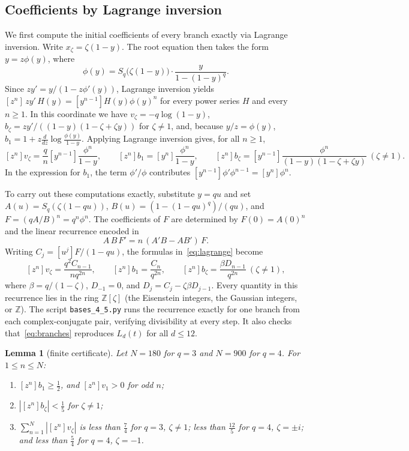 \documentclass[11pt]{amsart}
\newtheorem{lemma}[theorem]{Lemma}
\theoremstyle{remark}
\newcommand{\Z}{\mathbb{Z}}
\begin{document}
\subsection{Coefficients by Lagrange inversion}
We first compute the initial coefficients of every branch exactly via Lagrange
inversion. Write $x_\zeta=\zeta(1-y)$. The root equation then takes the form
$y=z\phi(y)$, where
\[
 \phi(y)=S_q\bigl(\zeta(1-y)\bigr)\cdot\frac{y}{1-(1-y)^q}.
\]
Since $zy'=y/(1-z\phi'(y))$, Lagrange inversion yields
$[z^n]\,zy'\,H(y)=[y^{n-1}]H(y)\phi(y)^n$ for every power series $H$ and every
$n\ge1$. In this coordinate we have $v_\zeta=-q\log(1-y)$,
$b_\zeta=zy'/((1-y)(1-\zeta+\zeta y))$ for $\zeta\ne1$, and, because
$y/z=\phi(y)$, $b_1=1+z\frac{d}{dz}\log\frac{\phi(y)}{1-y}$. Applying Lagrange
inversion gives, for all $n\ge1$,
\begin{equation}\label{eq:lagrange}
 [z^n]v_\zeta=\frac qn[y^{n-1}]\frac{\phi^n}{1-y},\qquad
 [z^n]b_1=[y^n]\frac{\phi^n}{1-y},\qquad
 [z^n]b_\zeta=[y^{n-1}]\frac{\phi^n}{(1-y)(1-\zeta+\zeta y)}\ (\zeta\ne1).
\end{equation}
In the expression for $b_1$, the term $\phi'/\phi$ contributes
$[y^{n-1}]\phi'\phi^{n-1}=[y^n]\phi^n$.

To carry out these computations exactly, substitute $y=qu$ and set
$A(u)=S_q(\zeta(1-qu))$, $B(u)=(1-(1-qu)^q)/(qu)$, and $F=(qA/B)^n=q^n\phi^n$.
The coefficients of $F$ are determined by $F(0)=A(0)^n$ and the linear
recurrence encoded in
\[
 A\,B\,F'=n\,(A'B-AB')\,F .
\]
Writing $C_j=[u^j]F/(1-qu)$, the formulas in~\eqref{eq:lagrange} become
\[
 [z^n]v_\zeta=\frac{q^2C_{n-1}}{nq^{2n}},\qquad [z^n]b_1=\frac{C_n}{q^{2n}},\qquad
 [z^n]b_\zeta=\frac{\beta D_{n-1}}{q^{2n}}\ (\zeta\ne1),
\]
where $\beta=q/(1-\zeta)$, $D_{-1}=0$, and $D_j=C_j-\zeta\beta D_{j-1}$. Every
quantity in this recurrence lies in the ring $\Z[\zeta]$ (the Eisenstein
integers, the Gaussian integers, or $\Z$). The script \texttt{bases\_4\_5.py}
runs the recurrence exactly for one branch from each complex-conjugate pair,
verifying divisibility at every step. It also checks that~\eqref{eq:branches}
reproduces $L_d(t)$ for all $d\le12$.

\begin{lemma}[finite certificate]\label{lem:finite}
Let $N=180$ for $q=3$ and $N=900$ for $q=4$. For $1\le n\le N$:
\begin{enumerate}
\item $[z^n]b_1\ge\frac12$, and $[z^n]v_1>0$ for odd $n$;
\item $|[z^n]b_\zeta|<\frac15$ for $\zeta\ne1$;
\item $\sum_{n=1}^N|[z^n]v_\zeta|$ is less than $\frac74$ for $q=3$, $\zeta\ne1$;
less than $\frac{12}5$ for $q=4$, $\zeta=\pm i$; and less than $\frac54$ for
$q=4$, $\zeta=-1$.
\end{enumerate}
\end{lemma}
\end{document}
